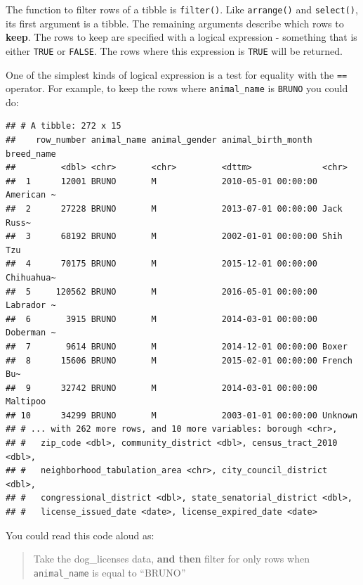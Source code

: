 \documentclass[]{Nemilov}
\newenvironment{Shaded}{\begin{snugshade}}{\end{snugshade}}
\newcommand{\KeywordTok}[1]{\textcolor[rgb]{0.13,0.29,0.53}{\textbf{#1}}}
\newcommand{\NormalTok}[1]{#1}
\newcommand{\OperatorTok}[1]{\textcolor[rgb]{0.81,0.36,0.00}{\textbf{#1}}}
\newcommand{\StringTok}[1]{\textcolor[rgb]{0.31,0.60,0.02}{#1}}
\begin{document}
The function to filter rows of a tibble is \texttt{filter()}. Like \texttt{arrange()} and \texttt{select()}, its first argument is a tibble. The remaining arguments describe which rows to \textbf{keep}. The rows to keep are specified with a logical expression - something that is either \texttt{TRUE} or \texttt{FALSE}. The rows where this expression is \texttt{TRUE} will be returned.

One of the simplest kinds of logical expression is a test for equality with the \texttt{==} operator. For example, to keep the rows where \texttt{animal\_name} is \texttt{BRUNO} you could do:

\begin{Shaded}
\end{Shaded}

\begin{verbatim}
## # A tibble: 272 x 15
##    row_number animal_name animal_gender animal_birth_month  breed_name
##         <dbl> <chr>       <chr>         <dttm>              <chr>     
##  1      12001 BRUNO       M             2010-05-01 00:00:00 American ~
##  2      27228 BRUNO       M             2013-07-01 00:00:00 Jack Russ~
##  3      68192 BRUNO       M             2002-01-01 00:00:00 Shih Tzu  
##  4      70175 BRUNO       M             2015-12-01 00:00:00 Chihuahua~
##  5     120562 BRUNO       M             2016-05-01 00:00:00 Labrador ~
##  6       3915 BRUNO       M             2014-03-01 00:00:00 Doberman ~
##  7       9614 BRUNO       M             2014-12-01 00:00:00 Boxer     
##  8      15606 BRUNO       M             2015-02-01 00:00:00 French Bu~
##  9      32742 BRUNO       M             2014-03-01 00:00:00 Maltipoo  
## 10      34299 BRUNO       M             2003-01-01 00:00:00 Unknown   
## # ... with 262 more rows, and 10 more variables: borough <chr>,
## #   zip_code <dbl>, community_district <dbl>, census_tract_2010 <dbl>,
## #   neighborhood_tabulation_area <chr>, city_council_district <dbl>,
## #   congressional_district <dbl>, state_senatorial_district <dbl>,
## #   license_issued_date <date>, license_expired_date <date>
\end{verbatim}

You could read this code aloud as:

\begin{quote}
Take the dog\_licenses data, \textbf{and then}
filter for only rows when \texttt{animal\_name} is equal to ``BRUNO''
\end{quote}
\end{document}
